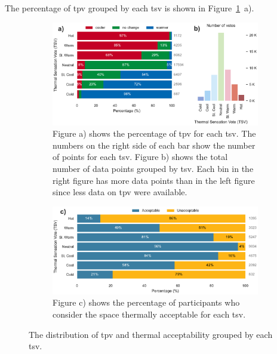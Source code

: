 The percentage of \ac{tpv} grouped by each \ac{tsv} is shown in Figure~\ref{fig:bar_plot_tp_by_ts}~a).
\begin{figure}[htb!]
    \centering
    \begin{subfigure}[b]{\textwidth}
        \centering
        \includegraphics[width=\textwidth]{figures/bar_plot_tp_by_ts}
        \caption{Figure a) shows the percentage of \ac{tpv} for each \ac{tsv}.
    The numbers on the right side of each bar show the number of points for each \ac{tsv}.
        Figure b) shows the total number of data points grouped by \ac{tsv}.
    Each bin in the right figure has more data points than in the left figure since less data on \ac{tpv} were available.}
    \label{fig:bar_plot_tp_by_ts}
    \end{subfigure}
    \par\bigskip %
    \begin{subfigure}[b]{\textwidth}
        \centering
        \includegraphics[width=\textwidth]{figures/bar_plot_thermal_acceptability_by_thermal_sensation_round}
    \caption{
        Figure c) shows the percentage of participants who consider the space thermally acceptable for each \ac{tsv}.}
        \label{fig:thermal_acceptability_by_ts}
    \end{subfigure}
    \caption{The distribution of \ac{tpv} and thermal acceptability grouped by each \ac{tsv}.}
\end{figure}
